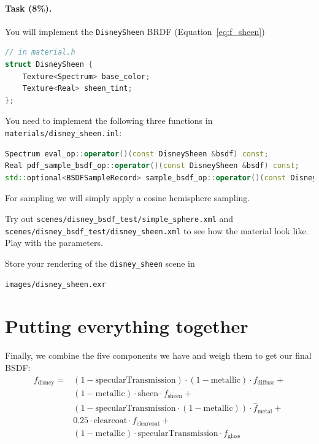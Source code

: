 \paragraph{Task (8\%).} You will implement the \lstinline{DisneySheen} BRDF (Equation~\ref{eq:f_sheen})
\begin{lstlisting}[language=c++]
// in material.h
struct DisneySheen {
    Texture<Spectrum> base_color;
    Texture<Real> sheen_tint;
};
\end{lstlisting}

You need to implement the following three functions in \lstinline{materials/disney_sheen.inl}:
\begin{lstlisting}[language=c++]
Spectrum eval_op::operator()(const DisneySheen &bsdf) const;
Real pdf_sample_bsdf_op::operator()(const DisneySheen &bsdf) const;
std::optional<BSDFSampleRecord> sample_bsdf_op::operator()(const DisneySheen &bsdf) const;
\end{lstlisting}

For sampling we will simply apply a cosine hemisphere sampling.

Try out \lstinline{scenes/disney_bsdf_test/simple_sphere.xml} and \lstinline{scenes/disney_bsdf_test/disney_sheen.xml} to see how the material look like. Play with the parameters.

Store your rendering of the \lstinline{disney_sheen} scene in
\begin{lstlisting}
images/disney_sheen.exr
\end{lstlisting}

\section{Putting everything together}
Finally, we combine the five components we have and weigh them to get our final BSDF:
\begin{equation}
\begin{aligned}
f_{\text{disney}} =& (1 - \text{specularTransmission}) \cdot (1 - \text{metallic}) \cdot f_{\text{diffuse}} + \\
                   & (1 - \text{metallic}) \cdot \text{sheen} \cdot f_{\text{sheen}} + \\
                   & (1 - \text{specularTransmission} \cdot (1 - \text{metallic})) \cdot \hat{f}_{\text{metal}} + \\
                   & 0.25 \cdot \text{clearcoat} \cdot f_{\text{clearcoat}} + \\
                   & (1 - \text{metallic}) \cdot \text{specularTransmission} \cdot f_{\text{glass}}
\end{aligned}
\label{eq:disney_bsdf}
\end{equation}

